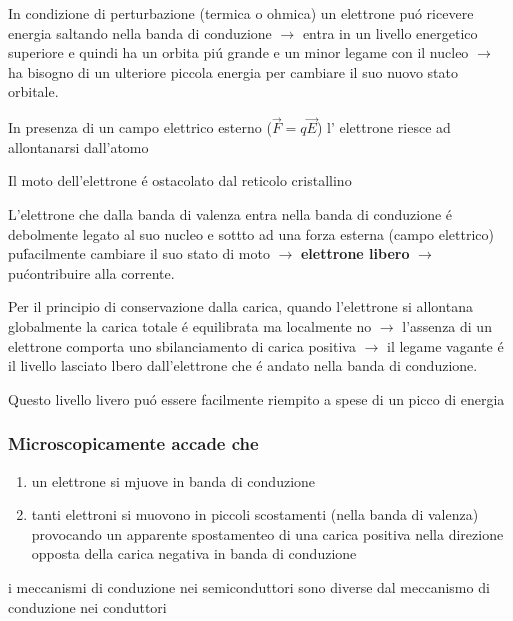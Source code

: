 In condizione di perturbazione (termica o ohmica) un elettrone pu\'o ricevere energia saltando nella banda di conduzione $\rightarrow$ entra in un livello energetico superiore e quindi ha un orbita pi\'u grande e un minor legame con il nucleo $\rightarrow$ ha bisogno di un ulteriore piccola energia per cambiare il suo nuovo stato orbitale.

In presenza di un campo elettrico esterno ($\overrightarrow{F}=q\overrightarrow{E}$) l' elettrone riesce ad allontanarsi dall'atomo

Il moto dell'elettrone \'e ostacolato dal reticolo cristallino

L'elettrone che dalla banda di valenza entra nella banda di conduzione \'e debolmente legato al suo nucleo e sottto ad una forza esterna (campo elettrico) pu\' facilmente cambiare il suo stato di moto $\rightarrow$ \textbf{elettrone libero} $\rightarrow$ pu\' contribuire alla corrente.

Per il principio di conservazione dalla carica, quando l'elettrone si allontana globalmente la carica totale \'e equilibrata ma localmente no $\rightarrow$ l'assenza di un elettrone comporta uno sbilanciamento di carica positiva $\rightarrow$ il legame vagante \'e il livello lasciato lbero dall'elettrone che \'e andato nella banda di conduzione.

Questo livello livero pu\'o essere facilmente riempito a spese di un picco di energia


\subsubsection{Microscopicamente accade che}
\begin{enumerate}
    \item un elettrone si mjuove in banda di conduzione
    \item tanti elettroni si muovono in piccoli scostamenti (nella banda di valenza) provocando un apparente spostamenteo di una carica positiva nella direzione opposta della carica negativa in banda di conduzione
\end{enumerate}

i meccanismi di conduzione nei semiconduttori sono diverse dal meccanismo di conduzione nei conduttori

